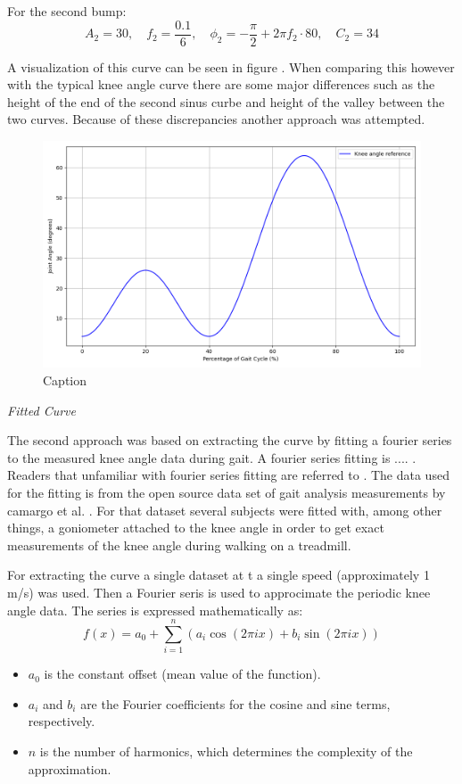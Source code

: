 For the second bump:
\[
A_2 = 30, \quad f_2 = \frac{0.1}{6}, \quad \phi_2 = -\frac{\pi}{2} + 2\pi f_2 \cdot 80, \quad C_2 = 34
\]

A visualization of this curve can be seen in figure . When comparing this however with the typical knee angle curve there are some major differences such as the height of the end of the second sinus curbe and height of the valley between the two curves. Because of these discrepancies another approach was attempted.
\begin{figure}
    \centering
    \includegraphics[width=0.5\linewidth]{images/simpleKneeAngle.png}
    \caption{Caption}
    \label{fig:enter-label}
\end{figure}
\newline

\textit{Fitted Curve}

The second approach was based on extracting the curve by fitting a fourier series to the measured knee angle data during gait. A fourier series fitting is .... . Readers that unfamiliar with fourier series fitting are referred to . The data used for the fitting is from the open source data set of gait analysis measurements by camargo et al. \cite{camargo_comprehensive_2021}. For that dataset several subjects were fitted with, among other things, a goniometer attached to the knee angle in order to get exact measurements of the knee angle during walking on a treadmill. 


For extracting the curve a single dataset at t a single speed (approximately 1 m/s) was used. Then a Fourier seris is used to approcimate the periodic knee angle data. The series is expressed mathematically as:
\begin{equation}
f(x) = a_0 + \sum_{i=1}^{n} \left( a_i \cos(2\pi i x) + b_i \sin(2\pi i x) \right)
\end{equation}

\begin{itemize}
    \item \(a_0\) is the constant offset (mean value of the function).
    \item \(a_i\) and \(b_i\) are the Fourier coefficients for the cosine and sine terms, respectively.
    \item \(n\) is the number of harmonics, which determines the complexity of the approximation.
\end{itemize}

